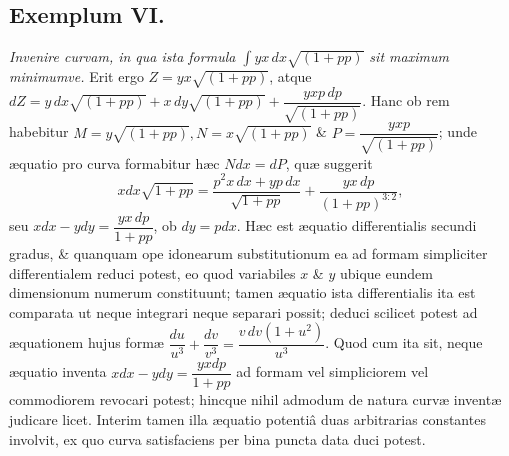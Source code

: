 \subsection*{Exemplum VI.}
\textit{Invenire curvam, in qua ista formula $\int yx\,dx\sqrt{(1+pp)}$ sit maximum minimumve.}
Erit ergo $Z=yx\sqrt{(1+pp)}$, atque $dZ=y\,dx\sqrt{(1+pp)}+x\,dy\sqrt{(1+pp)}+\dfrac{yx p\,dp}{\sqrt{(1+pp)}}$. Hanc ob rem habebitur $M=y\sqrt{(1+pp)},N=x\sqrt{(1+pp)}$ \& $P=\dfrac{yxp}{\sqrt{(1+pp)}}$; unde æquatio pro curva formabitur hæc $Ndx=dP$, quæ suggerit
\[
xdx\sqrt{1+pp}=\frac{p^2x\,dx+yp\,dx}{\sqrt{1+pp}}+\frac{yx\,dp}{(1+pp)^{3:2}},
\]
seu $xdx-ydy=\dfrac{yx\,dp}{1+pp}$, ob $dy=pdx$. Hæc est æquatio differentialis secundi gradus, \& quanquam ope idonearum substitutionum ea ad formam simpliciter differentialem reduci potest, eo quod variabiles $x$ \& $y$ ubique eundem dimensionum numerum constituunt; tamen æquatio ista differentialis ita est comparata ut neque integrari neque separari possit; deduci scilicet potest ad æquationem hujus formæ $\dfrac{du}{u^3}+\dfrac{dv}{v^3}=\dfrac{v\,dv(1+u^2)}{u^3}$. Quod cum ita sit, neque æquatio inventa $xdx-ydy=\dfrac{yxdp}{1+pp}$ ad formam vel simpliciorem vel commodiorem revocari potest; hincque nihil admodum de natura curvæ inventæ judicare licet. Interim tamen illa æquatio potentiâ duas arbitrarias constantes involvit, ex quo curva satisfaciens per bina puncta data duci potest.

